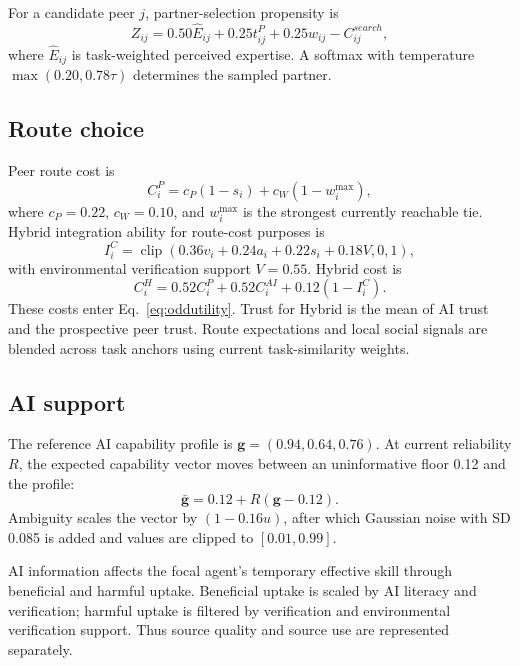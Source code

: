 \documentclass[11pt]{article}
\newcommand{\clip}{\operatorname{clip}}
\begin{document}
For a candidate peer $j$, partner-selection propensity is
\begin{equation}
Z_{ij}=0.50\widehat E_{ij}+0.25t_{ij}^{P}+0.25w_{ij}-C_{ij}^{search},
\end{equation}
where $\widehat E_{ij}$ is task-weighted perceived expertise. A softmax with temperature $\max(0.20,0.78\tau)$ determines the sampled partner.

\subsection{Route choice}
Peer route cost is
\begin{equation}
C_i^{P}=c_P(1-s_i)+c_W(1-w_i^{\max}),
\end{equation}
where $c_P=0.22$, $c_W=0.10$, and $w_i^{\max}$ is the strongest currently reachable tie. Hybrid integration ability for route-cost purposes is
\begin{equation}
I_i^{C}=\clip(0.36v_i+0.24a_i+0.22s_i+0.18V,0,1),
\end{equation}
with environmental verification support $V=0.55$. Hybrid cost is
\begin{equation}
C_i^{H}=0.52C_i^{P}+0.52C_i^{AI}+0.12(1-I_i^{C}).
\end{equation}
These costs enter Eq.~\ref{eq:oddutility}. Trust for Hybrid is the mean of AI trust and the prospective peer trust. Route expectations and local social signals are blended across task anchors using current task-similarity weights.

\subsection{AI support}
The reference AI capability profile is $\mathbf{g}=(0.94,0.64,0.76)$. At current reliability $R$, the expected capability vector moves between an uninformative floor 0.12 and the profile:
\begin{equation}
\bar{\mathbf g}=0.12+R(\mathbf g-0.12).
\end{equation}
Ambiguity scales the vector by $(1-0.16u)$, after which Gaussian noise with SD 0.085 is added and values are clipped to $[0.01,0.99]$.

AI information affects the focal agent's temporary effective skill through beneficial and harmful uptake. Beneficial uptake is scaled by AI literacy and verification; harmful uptake is filtered by verification and environmental verification support. Thus source quality and source use are represented separately.
\end{document}
